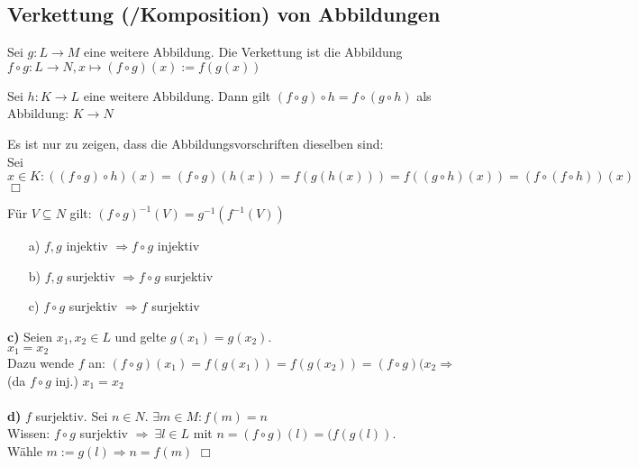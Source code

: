 \subsection{Verkettung (/Komposition) von Abbildungen}

\begin{defi}
	Sei $g:L\rightarrow M$ eine weitere Abbildung. Die Verkettung   ist die Abbildung $f\circ g:L\rightarrow N,x\mapsto (f\circ g)(x):=f(g(x))$
\end{defi}

\begin{lem}
	Sei $h:K\rightarrow L$ eine weitere Abbildung. Dann gilt $(f\circ g)\circ h = f\circ(g\circ h)$ als Abbildung: $K\rightarrow N$
\end{lem}

\begin{bew}
	Es ist nur zu zeigen, dass die Abbildungsvorschriften dieselben sind:\\
	Sei $x\in K:((f\circ g)\circ h)(x)=(f\circ g)(h(x))=f(g(h(x)))=f((g\circ h)(x))=(f\circ(f\circ h))(x)\:$ \hfill $\Box$\\
\end{bew}

\begin{ub}
	Für $V\subseteq N$ gilt: $(f\circ g)^{-1}(V)=g^{-1}(f^{-1}(V))$
\end{ub}

\begin{lem}
	\begin{itemize}
		\item[]
		\item[a)] $f,g$ injektiv $\Rightarrow f\circ g$ injektiv
		\item[b)] $f,g$ surjektiv $\Rightarrow f\circ g$ surjektiv
		\item[c)] $f\circ g$ surjektiv $\Rightarrow f$ surjektiv
	\end{itemize}
\end{lem}

\begin{bew}
	\textbf{c)} Seien $x_{1},x_{2}\in L$ und gelte $g(x_{1})=g(x_{2}).$\\
	\zz $x_{1}=x_{2}$\\
	Dazu wende $f$ an: $(f\circ g)(x_{1})=f(g(x_{1}))=f(g(x_{2}))=(f\circ g)(x_{2}\Rightarrow$ (da $f\circ g$ inj.) $x_{1}=x_{2}$ \\
	\\
	\textbf{d)} \zz $f$ surjektiv.
	Sei $n\in N$. \zz $\exists m\in M:f(m)=n$\\
	Wissen: $f\circ g$ surjektiv $\Rightarrow\:\exists l\in L$ mit $n=(f\circ g)(l)=(f(g(l))$.\\
	Wähle $m:=g(l) \Rightarrow n=f(m)$ \hfill $\Box$
\end{bew}

